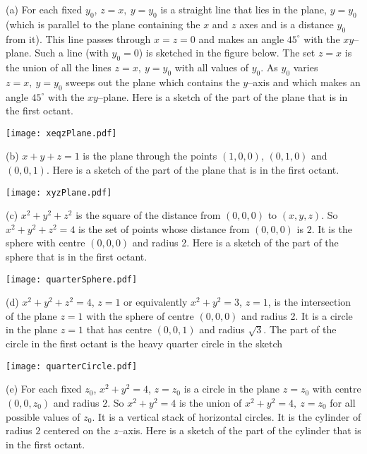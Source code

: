 \begin{solution}
(a) 
For each fixed $y_0$, $z=x,\ y=y_0$ is a straight line 
that lies in the plane, $y=y_0$ (which is parallel to the plane 
containing the $x$ and $z$ axes and is a distance $y_0$ from it). 
This line passes through $x=z=0$ and makes an angle $45^\circ$ 
with the $xy$--plane. Such a line (with $y_0=0$) is sketched in the 
figure below.
The set $z=x$ is the union of all the lines $z=x,\ y=y_0$ with all 
values of $y_0$. As $y_0$ varies  $z=x,\ y=y_0$ sweeps out the 
plane which contains the $y$--axis and which  makes an angle 
$45^\circ$ with the $xy$--plane. Here is a sketch of the part of the plane 
that is in the first octant.

\begin{center}
     \texttt{[image: xeqzPlane.pdf]}
\end{center}


(b) 
$x+y+z=1$ is the plane through the points $(1,0,0)$, $(0,1,0)$
and  $(0,0,1)$. Here is a sketch of the part of the plane 
that is in the first octant.

\begin{center}
     \texttt{[image: xyzPlane.pdf]}
\end{center}

(c)
  $x^2+y^2+z^2$ is the square of the distance from $(0,0,0)$ to $(x,y,z)$.
So $x^2+y^2+z^2=4$ is the set of points whose distance from $(0,0,0)$ is
$2$. It is the sphere with centre $(0,0,0)$ and radius 2.
Here is a sketch of the part of the sphere that is in the first octant.

\begin{center}
     \texttt{[image: quarterSphere.pdf]}
\end{center}

(d) 
$x^2+y^2+z^2=4$, $z=1$ or equivalently $x^2+y^2=3$, $z=1$,
is the intersection of the plane $z=1$ with the sphere of centre 
$(0,0,0)$ and radius 2. It is a circle in the plane $z=1$ 
that has centre $(0,0,1)$ and radius $\sqrt{3}$. The part of the circle
in the first octant is the heavy quarter circle in the sketch

\begin{center}
     \texttt{[image: quarterCircle.pdf]}
\end{center}

(e) 
For each fixed $z_0$, $x^2+y^2=4$, $z=z_0$ is a circle in the 
plane $z=z_0$ with centre $(0,0,z_0)$ and radius $2$. 
So $x^2+y^2=4$ is the union of $x^2+y^2=4,\ z=z_0$ for all 
possible values of $z_0$. It is  a vertical stack of horizontal 
circles. It is the cylinder of radius $2$ centered on the $z$--axis.
Here is a sketch of the part of the cylinder that is in the first octant.


\end{solution}
